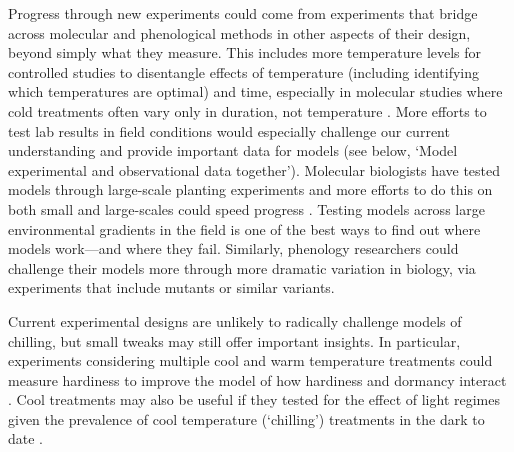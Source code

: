 \documentclass[11pt]{article}
\begin{document}
Progress through new experiments could come from experiments that bridge across molecular and phenological methods in other aspects of their design, beyond simply what they measure. This includes more temperature levels for controlled studies to disentangle effects of temperature (including identifying which temperatures are optimal) and time, especially in molecular studies where cold treatments often vary only in duration, not temperature \citep[e.g.,][]{pan2023epigenetic}. More efforts to test lab results in field conditions would especially challenge our current understanding and provide important data for models (see below, `Model experimental and observational data together'). Molecular biologists have tested models through large-scale planting experiments \citep{Wilczek:2009oa,Burghardt2015} and more efforts to do this on both small and large-scales could speed progress \citep{Satake2022}. 
Testing models across large environmental gradients in the field is one of the best ways to find out where models work---and where they fail. Similarly, phenology researchers could challenge their models more through more dramatic variation in biology, via experiments that include mutants or similar variants. 

Current experimental designs are unlikely to radically challenge models of chilling, but small tweaks may still offer important insights. In particular, experiments considering multiple cool and warm temperature treatments could measure hardiness to improve the model of how hardiness and dormancy interact \citep{kovaleskipreprint}. Cool treatments may also be useful if they tested for the effect of light regimes given the prevalence of cool temperature (`chilling') treatments in the dark to date \citep{ospreebbms}. 
\end{document}
